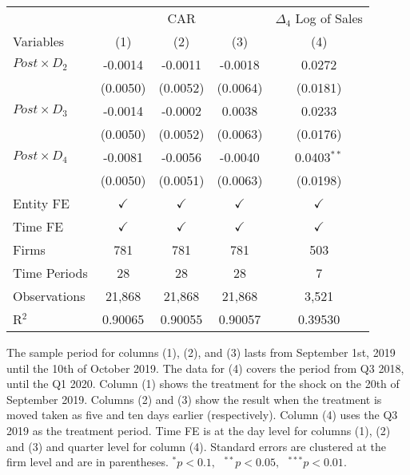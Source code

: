 \documentclass[12pt]{article}
\begin{document}
\begin{table}[t]
    
    \label{tab:main_results}
    
    \centering
    \begin{tabular}{lcccc}
        \toprule
        \toprule
        & \multicolumn{3}{c}{CAR}     & \multicolumn{1}{c}{$\Delta_4$ Log of Sales} \\
        Variables                   & (1)           & (2) & (3)   & (4)\\
        \midrule
        $Post \times D_2$           & -0.0014       &  -0.0011   & -0.0018  & 0.0272\\
        & (0.0050)      &  (0.0052)  & (0.0064)  & (0.0181)\\
        $Post \times D_3$           & -0.0014       &  -0.0002   & 0.0038  & 0.0233\\
        & (0.0050)      &  (0.0052)  & (0.0063)  & (0.0176)\\
        $Post \times D_4$           & -0.0081       &  -0.0056   & -0.0040  & 0.0403$^{**}$\\
        & (0.0050)      &  (0.0051)  & (0.0063)  & (0.0198)\\
        Entity FE                   & $\checkmark$  & $\checkmark$  & $\checkmark$  & $\checkmark$\\
        Time FE                     & $\checkmark$  & $\checkmark$  & $\checkmark$  & $\checkmark$\\
        Firms                       & 781           & 781  & 781  & 503\\
        Time Periods                & 28            & 28  & 28  & 7\\
        Observations                & 21,868        & 21,868  & 21,868  & 3,521\\
        R$^2$                       & 0.90065       & 0.90055  & 0.90057  & 0.39530\\  
        \bottomrule
    \end{tabular}
    
    \begin{tablenotes}
        \footnotesize
        \item The sample period for columns (1), (2), and (3) lasts from September 1st, 2019 until the 10th of October 2019. The data for (4) covers the period from Q3 2018, until the Q1 2020. Column (1) shows the treatment for the shock on the 20th of September 2019. Columns (2) and (3) show the result when the treatment is moved taken as five and ten days earlier (respectively). Column (4) uses the Q3 2019 as the treatment period. Time FE is at the day level for columns (1), (2) and (3) and quarter level for column (4). Standard errors are clustered at the firm level and are in parentheses. $^{*}p<0.1, \text{ } ^{**}p<0.05,\text{ } ^{***}p<0.01$.
    \end{tablenotes}
\end{table}
\end{document}
